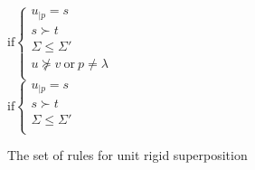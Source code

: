 \begin{figure}[htb]
\begin{center}

    \doubleLine{}
    \DP{} \\[12pt]

    \doubleLine{}
    \DP{} \\[12pt]

    \doubleLine{}
    \DP{}
    $\text{if} \left\{\begin{array}{l}
      u_{|p} = s \\
      s \succ t \\
      \Sigma \leq \Sigma'\\
      u \not\succeq v ~ \text{or} ~ p \neq \lambda \\
    \end{array}\right.$ \\[12pt]

    \doubleLine{}
    \DP{}
    $\text{if} \left\{\begin{array}{l}
      u_{|p} = s \\
      s \succ t \\
      \Sigma \leq \Sigma'\\
    \end{array}\right.$

  \caption{The set of rules for unit rigid superposition}
  \label{fig:unit-sup-rules}
  \end{center}
\end{figure}

